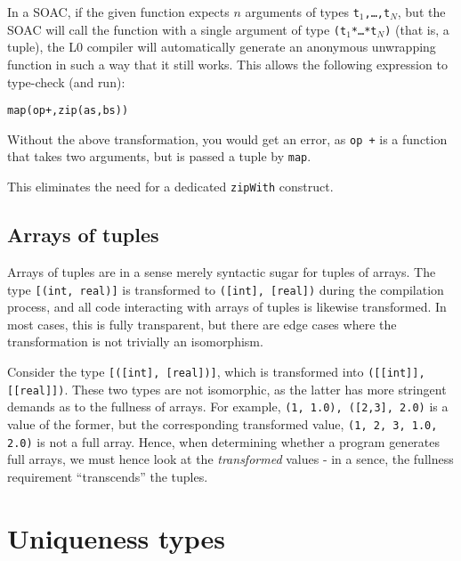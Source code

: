 \documentclass[oneside]{memoir}
\begin{document}
In a SOAC, if the given function expects $n$ arguments of types
\texttt{t$_{1}$,\ldots,{}t$_{N}$}, but the SOAC will call the function
with a single argument of type \texttt{(t$_{1}$*\ldots{}*t$_{N}$)}
(that is, a tuple), the L0 compiler will automatically generate an
anonymous unwrapping function in such a way that it still works.  This
allows the following expression to type-check (and run):

\begin{alltt}
  map(op +, zip(as, bs))
\end{alltt}

Without the above transformation, you would get an error, as
\texttt{op +} is a function that takes two arguments, but is passed a
tuple by \texttt{map}.

This eliminates the need for a dedicated \texttt{zipWith} construct.

\subsection{Arrays of tuples}

Arrays of tuples are in a sense merely syntactic sugar for tuples of
arrays.  The type \texttt{[(int, real)]} is transformed to
\texttt{([int], [real])} during the compilation process, and all code
interacting with arrays of tuples is likewise transformed.  In most
cases, this is fully transparent, but there are edge cases where the
transformation is not trivially an isomorphism.

Consider the type \texttt{[([int], [real])]}, which is transformed
into \texttt{([[int]], [[real]])}.  These two types are not
isomorphic, as the latter has more stringent demands as to the
fullness of arrays.  For example, \texttt{{({1}, {1.0}), ([2,3],
    {2.0})}} is a value of the former, but the corresponding
transformed value, \texttt{({{1}, {2, 3}}, {{1.0}, {2.0}})} is not a
full array.  Hence, when determining whether a program generates full
arrays, we must hence look at the \textit{transformed} values - in a
sence, the fullness requirement ``transcends'' the tuples.

\section{Uniqueness types}
\label{sec:l0-uniqueness-types}
\end{document}
